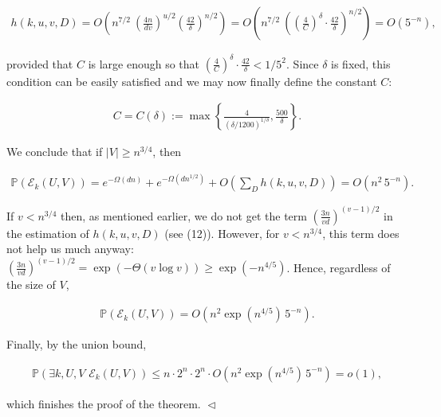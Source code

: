 \documentclass[10pt,a4paper]{article}
\begin{document}
\[\begin{gathered}
h(k,u,v,D)=O\left(n^{7/2}\ \left(\frac{4n}{dv}\right)^{u/2}\left(\frac{42}{\delta}\right)^{n/2}\right)=O\left(n^{7/2}\ \left(\left(\frac{4}{C}\right)^{\delta}\cdot\frac{42}{\delta}\right)^{n/2}\right)=O\left(5^{-n}\right),
\end{gathered}\]


provided that $C$ is large enough so that
$\left(\frac{4}{C}\right)^{\delta}\cdot\frac{42}{\delta}<1/5^{2}$.
Since $\delta$ is fixed, this condition can be easily satisfied and we may now finally define the constant $C$:\par


\[\begin{gathered}
C=C(\delta):=\max\left\{\frac{4}{(\delta/1200)^{1/\delta}},\frac{500}{\delta}\right\}.
\end{gathered}\]




We conclude that if $|V|\geq n^{3/4}$, then\par


\[\begin{gathered}
\mathbb{P}(\mathcal{E}_{k}(U,V))=e^{-\Omega(dn)}+e^{-\Omega(dn^{1/2})}+O\left(\sum_{D}h(k,u,v,D)\right)=O\left(n^{2}\,5^{-n}\right).
\end{gathered}\]


If $v<n^{3/4}$ then, as mentioned earlier, we do not get the term $\left(\frac{3n}{vd}\right)^{(v-1)/2}$ in the estimation of $h(k,u,v,D)$ (see (12)). However, for $v<n^{3/4}$, this term does not help us much anyway: $\left(\frac{3n}{vd}\right)^{(v-1)/2}=\exp(-\Theta(v\log v))\geq\exp(-n^{4/5})$. Hence, regardless of the size of $V$,\par


\[\begin{gathered}
\mathbb{P}(\mathcal{E}_{k}(U,V))=O\left(n^{2}\exp(n^{4/5})\,5^{-n}\right).
\end{gathered}\]


Finally, by the union bound,\par


\[\begin{gathered}
\mathbb{P}\left(\exists k,U,V\,\,\mathcal{E}_{k}(U,V)\right)\leq n\cdot 2^{n}\cdot 2^{n}\cdot O\left(n^{2}\exp(n^{4/5})\,5^{-n}\right)=o(1),
\end{gathered}\]


which finishes the proof of the theorem.
$\vartriangleleft$\par
\end{document}
